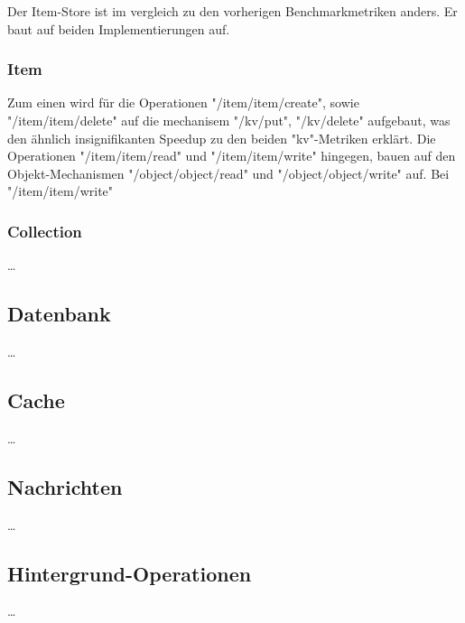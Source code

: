 \FloatBarrier

Der Item-Store ist im vergleich zu den vorherigen Benchmarkmetriken anders. Er baut auf beiden Implementierungen auf.

\subsubsection{Item}

Zum einen wird für die Operationen "/item/item/create", sowie "/item/item/delete" auf die mechanisem "/kv/put", "/kv/delete" aufgebaut, was den ähnlich insignifikanten Speedup zu den beiden "kv"-Metriken erklärt. 
Die Operationen "/item/item/read" und "/item/item/write" hingegen, bauen auf den Objekt-Mechanismen "/object/object/read" und "/object/object/write" auf. Bei "/item/item/write"

\subsubsection{Collection}

\dots


\FloatBarrier

\subsection{Datenbank}

\dots


\subsection{Cache}

\dots

\subsection{Nachrichten}

\dots



\subsection{Hintergrund-Operationen}

\dots

